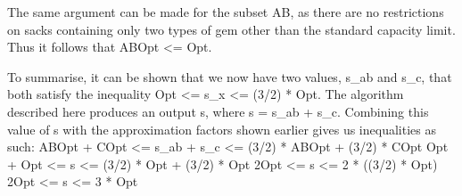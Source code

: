 \documentclass[paper=a4, fontsize=12pt]{article}
\begin{document}
The same argument can be made for the subset AB, as there are no restrictions on sacks containing only two types of gem other than the standard capacity limit. Thus it follows that ABOpt <= Opt.

To summarise, it can be shown that we now have two values, s_ab and s_c, that both satisfy the inequality Opt <= s_x <= (3/2) * Opt. The algorithm described here produces an output s, where s = s_ab + s_c. Combining this value of s with the approximation factors shown earlier gives us inequalities as such:
ABOpt + COpt <= s_ab + s_c <= (3/2) * ABOpt + (3/2) * COpt
Opt + Opt <= s <= (3/2) * Opt + (3/2) * Opt
2Opt <= s <= 2 * ((3/2) * Opt)
2Opt <= s <= 3 * Opt
\end{document}
